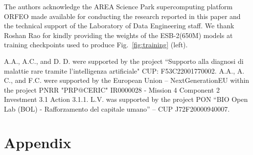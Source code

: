 \documentclass{article}
\begin{document}
\begin{ack}
The authors acknowledge the AREA Science Park supercomputing platform ORFEO made available for conducting the research reported in this paper and the technical support of the Laboratory of Data Engineering staff. We thank Roshan Rao for kindly providing the weights of the ESB-2(650M) models at training checkpoints used to produce Fig.~\ref{fig:training} (left).

A.A., A.C., and D. D. were supported by the project “Supporto alla diagnosi di malattie rare tramite l'intelligenza artificiale" CUP: F53C22001770002.
%
A.A., A. C., and F.C. were supported by the European Union – NextGenerationEU within the project PNRR "PRP@CERIC" IR0000028 - Mission 4 Component 2 Investment 3.1 Action 3.1.1.
%
L.V. was supported by the project PON “BIO Open Lab (BOL) - Rafforzamento del capitale umano” – CUP J72F20000940007.  
%
\end{ack} 

\clearpage
\newpage



\clearpage
\newpage

\appendix

\section*{Appendix}\label{app}
\renewcommand{\thefigure}{S\arabic{figure}}
\setcounter{figure}{0}
\end{document}
